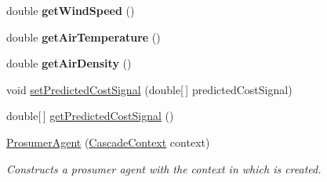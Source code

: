\begin{DoxyCompactItemize}
\item 
\hypertarget{classuk_1_1ac_1_1dmu_1_1iesd_1_1cascade_1_1agents_1_1prosumers_1_1_prosumer_agent_ab2d612a6d31147ad2433a3f3a89038d1}{double {\bfseries get\-Wind\-Speed} ()}\label{classuk_1_1ac_1_1dmu_1_1iesd_1_1cascade_1_1agents_1_1prosumers_1_1_prosumer_agent_ab2d612a6d31147ad2433a3f3a89038d1}

\item 
\hypertarget{classuk_1_1ac_1_1dmu_1_1iesd_1_1cascade_1_1agents_1_1prosumers_1_1_prosumer_agent_a7882764e5d533927903ee7196298cdac}{double {\bfseries get\-Air\-Temperature} ()}\label{classuk_1_1ac_1_1dmu_1_1iesd_1_1cascade_1_1agents_1_1prosumers_1_1_prosumer_agent_a7882764e5d533927903ee7196298cdac}

\item 
\hypertarget{classuk_1_1ac_1_1dmu_1_1iesd_1_1cascade_1_1agents_1_1prosumers_1_1_prosumer_agent_abc13a61e3b415d2f1c536b6c4305bc33}{double {\bfseries get\-Air\-Density} ()}\label{classuk_1_1ac_1_1dmu_1_1iesd_1_1cascade_1_1agents_1_1prosumers_1_1_prosumer_agent_abc13a61e3b415d2f1c536b6c4305bc33}

\item 
void \hyperlink{classuk_1_1ac_1_1dmu_1_1iesd_1_1cascade_1_1agents_1_1prosumers_1_1_prosumer_agent_abedc36b78c5e47aeac7c948c143ba5ec}{set\-Predicted\-Cost\-Signal} (double\mbox{[}$\,$\mbox{]} predicted\-Cost\-Signal)
\item 
double\mbox{[}$\,$\mbox{]} \hyperlink{classuk_1_1ac_1_1dmu_1_1iesd_1_1cascade_1_1agents_1_1prosumers_1_1_prosumer_agent_a91c1c0ff95ef03018719412fe7dedbf2}{get\-Predicted\-Cost\-Signal} ()
\item 
\hyperlink{classuk_1_1ac_1_1dmu_1_1iesd_1_1cascade_1_1agents_1_1prosumers_1_1_prosumer_agent_a8210ffa78c7f4ef86f01383421c08a87}{Prosumer\-Agent} (\hyperlink{classuk_1_1ac_1_1dmu_1_1iesd_1_1cascade_1_1context_1_1_cascade_context}{Cascade\-Context} context)
\begin{DoxyCompactList}\small\item\em Constructs a prosumer agent with the context in which is created. \end{DoxyCompactList}\end{DoxyCompactItemize}
